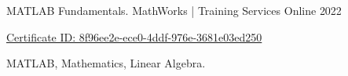 \begin{cventries}
	
		
	\cventry
	{MATLAB Fundamentals.} %
	{MathWorks | Training Services} %
	{Online} %
	{2022} %
	{
		\begin{cvitems} %
			\item {\href{https://matlabacademy.mathworks.com/progress/share/certificate.html?id=789d5f9e-7698-42e1-a02d-bd04cb56c131\&/}{Certificate ID: 8f96ee2e-ece0-4ddf-976e-3681e03ed250}}
			\item { MATLAB, Mathematics, Linear Algebra.}
		\end{cvitems}
	}
	
	

\end{cventries}
